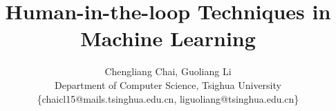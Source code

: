 \documentclass[11pt]{article}
\begin{document}
\title{Human-in-the-loop Techniques in Machine Learning}

\author{Chengliang Chai, Guoliang Li\\ 
	\small Department of Computer Science, Tsighua University\\ 
	\small \{chaicl15@mails.tsinghua.edu.cn, liguoliang@tsinghua.edu.cn\}}

\maketitle










%
%  
\end{document}
